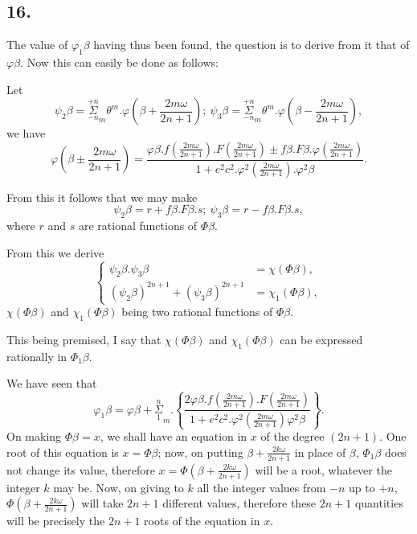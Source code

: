 \documentclass{article}
\begin{document}
\subsection*{16.}

The value of $\varphi_{1}\beta$ having thus been found, the question is to derive from it that of $\varphi\beta$. Now this can easily be done as follows:

Let
\[ \psi_{2}\beta=\overset{+n}{\underset{-n}{\Sigma}}_{m}\theta^{m}.\varphi\left(\beta+\frac{2m\omega}{2n+1}\right);\ \psi_{3}\beta=\overset{+n}{\underset{-n}{\Sigma}}_{m}\theta^{m}.\varphi\left(\beta-\frac{2m\omega}{2n+1}\right), \tag{78.} \]
we have
\[ \varphi\left(\beta\pm\frac{2m\omega}{2n+1}\right)=\frac{\varphi\beta.f\left(\frac{2m\omega}{2n+1}\right).F\left(\frac{2m\omega}{2n+1}\right)\pm f\beta.F\beta.\varphi\left(\frac{2m\omega}{2n+1}\right)}{1+e^{2}c^{2}.\varphi^{2}\left(\frac{2m\omega}{2n+1}\right).\varphi^{2}\beta}. \]

From this it follows that we may make
\[ \psi_{2}\beta=r+f\beta.F\beta.s;\ \psi_{3}\beta=r-f\beta.F\beta.s, \]
where $r$ and $s$ are rational functions of $\Phi\beta$.

From this we derive
\[ \left\{\begin{aligned}
\psi_{2}\beta.\psi_{3}\beta&=\chi(\Phi\beta),\\
(\psi_{2}\beta)^{2n+1}+(\psi_{3}\beta)^{2n+1}&=\chi_{1}(\Phi\beta),
\end{aligned}\right. \tag{79.} \]
$\chi(\Phi\beta)$ and $\chi_{1}(\Phi\beta)$ being two rational functions of $\Phi\beta$.

This being premised, I say that $\chi(\Phi\beta)$ and $\chi_{1}(\Phi\beta)$ can be expressed rationally in $\Phi_{1}\beta$.

We have seen that
\[ \varphi_{1}\beta=\varphi\beta+\overset{n}{\underset{1}{\Sigma}}_{m}.\left\{\frac{2\varphi\beta.f\left(\frac{2m\omega}{2n+1}\right).F\left(\frac{2m\omega}{2n+1}\right)}{1+e^{2}c^{2}.\varphi^{2}\left(\frac{2m\omega}{2n+1}\right)\varphi^{2}\beta}\right\}. \tag{80.} \]
On making $\Phi\beta=x$, we shall have an equation in $x$ of the degree $(2n+1)$. One root of this equation is $x=\Phi\beta$; now, on putting $\beta+\frac{2k\omega}{2n+1}$ in place of $\beta$, $\Phi_{1}\beta$ does not change its value, therefore $x=\Phi\left(\beta+\frac{2k\omega}{2n+1}\right)$ will be a root, whatever the integer $k$ may be. Now, on giving to $k$ all the integer values from $-n$ up to $+n$, $\Phi\left(\beta+\frac{2k\omega}{2n+1}\right)$ will take $2n+1$ different values, therefore these $2n+1$ quantities will be precisely the $2n+1$ roots of the equation in $x$.
\end{document}
